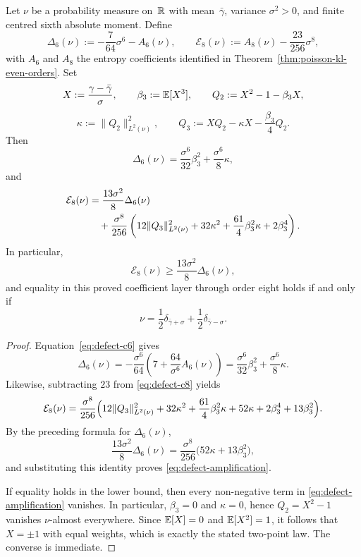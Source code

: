\begin{corollary}\label{thm:poisson-defect-amplification}
Let $\nu$ be a probability measure on~$\mathbb{R}$ with mean~$\bar{\gamma}$,
variance $\sigma^2>0$, and finite centred sixth absolute moment.  Define
\[
\Delta_6(\nu)
:=-\frac{7}{64}\sigma^6-A_6(\nu),
\qquad
\mathcal E_8(\nu)
:=A_8(\nu)-\frac{23}{256}\sigma^8,
\]
with \(A_6\) and \(A_8\) the entropy coefficients identified in
Theorem~\ref{thm:poisson-kl-even-orders}.  Set
\[
X:=\frac{\gamma-\bar{\gamma}}{\sigma},
\qquad
\beta_3:=\mathbb{E}[X^3],
\qquad
Q_2:=X^2-1-\beta_3X,
\]
\[
\kappa:=\|Q_2\|_{L^2(\nu)}^2,
\qquad
Q_3:=XQ_2-\kappa X-\frac{\beta_3}{4}Q_2.
\]
Then
\[
\Delta_6(\nu)
=\frac{\sigma^6}{32}\beta_3^2+\frac{\sigma^6}{8}\kappa,
\]
and
\begin{align}
\mathcal E_8(\nu)
&=
\frac{13\sigma^2}{8}\Delta_6(\nu)
\notag\\
&\quad
+\frac{\sigma^8}{256}\left(
12\|Q_3\|_{L^2(\nu)}^2
+32\kappa^2
+\frac{61}{4}\beta_3^2\kappa
+2\beta_3^4
\right). \label{eq:defect-amplification}
\end{align}
In particular,
\[
\mathcal E_8(\nu)\ge
\frac{13\sigma^2}{8}\Delta_6(\nu),
\]
and equality in this proved coefficient layer through order eight holds if and only if
\[
\nu=\frac12\delta_{\bar{\gamma}+\sigma}
+\frac12\delta_{\bar{\gamma}-\sigma}.
\]
\end{corollary}

\begin{proof}
Equation~\eqref{eq:defect-c6} gives
\[
\Delta_6(\nu)
=-\frac{\sigma^6}{64}
\left(7+\frac{64}{\sigma^6}A_6(\nu)\right)
=\frac{\sigma^6}{32}\beta_3^2+\frac{\sigma^6}{8}\kappa.
\]
Likewise, subtracting $23$ from \eqref{eq:defect-c8} yields
\[
\mathcal E_8(\nu)
=\frac{\sigma^8}{256}\Bigl(
12\|Q_3\|_{L^2(\nu)}^2
+32\kappa^2
+\frac{61}{4}\beta_3^2\kappa
+52\kappa
+2\beta_3^4
+13\beta_3^2
\Bigr).
\]
By the preceding formula for \(\Delta_6(\nu)\),
\[
\frac{13\sigma^2}{8}\Delta_6(\nu)
=\frac{\sigma^8}{256}\bigl(52\kappa+13\beta_3^2\bigr),
\]
and substituting this identity proves \eqref{eq:defect-amplification}.

If equality holds in the lower bound, then every non-negative term in
\eqref{eq:defect-amplification} vanishes.  In particular,
$\beta_3=0$ and $\kappa=0$, hence $Q_2=X^2-1$ vanishes
$\nu$-almost everywhere.  Since $\mathbb{E}[X]=0$ and $\mathbb{E}[X^2]=1$, it follows
that $X=\pm 1$ with equal weights, which is exactly the stated
two-point law.  The converse is immediate.
\end{proof}

